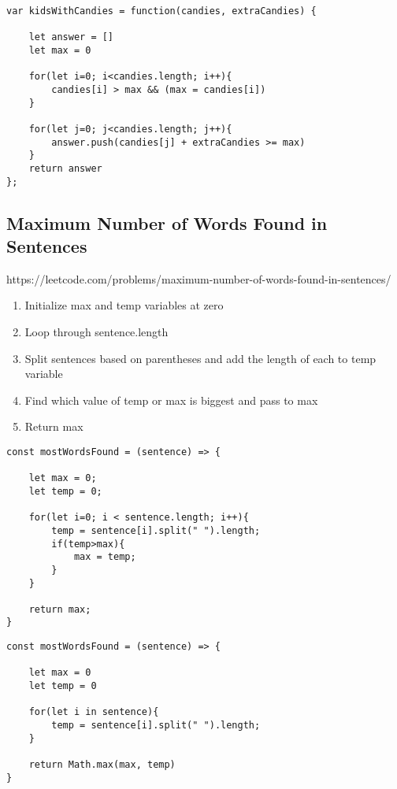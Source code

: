 \documentclass[10pt]{article}
\begin{document}
\begin{lstlisting}[title=Solution kidsWithCandies with for loop, captionpos=t]
var kidsWithCandies = function(candies, extraCandies) {
    
    let answer = []
    let max = 0
    
    for(let i=0; i<candies.length; i++){
        candies[i] > max && (max = candies[i])
    }
    
    for(let j=0; j<candies.length; j++){
        answer.push(candies[j] + extraCandies >= max)
    }
    return answer
};
\end{lstlisting}
\medskip %

\pagebreak
\medskip %
\subsection{Maximum Number of Words Found in Sentences}
https://leetcode.com/problems/maximum-number-of-words-found-in-sentences/

\begin{enumerate}
	\item Initialize max and temp variables at zero 
	\item Loop through sentence.length 
	\item Split sentences based on parentheses and add the length of each to temp variable 
	\item Find which value of temp or max is biggest and pass to max
	\item Return max
\end{enumerate}

\begin{lstlisting}[title=Solution mostWordsFound, captionpos=t]
const mostWordsFound = (sentence) => {

    let max = 0;
    let temp = 0;

    for(let i=0; i < sentence.length; i++){
        temp = sentence[i].split(" ").length;
        if(temp>max){
            max = temp;
        }
    }
    
    return max;
}
\end{lstlisting}

\begin{lstlisting}[title=Solution mostWordsFound with for-in loop and Math.max, captionpos=t]
const mostWordsFound = (sentence) => {
    
    let max = 0
    let temp = 0
    
    for(let i in sentence){
        temp = sentence[i].split(" ").length;
    }
    
    return Math.max(max, temp)
}
\end{lstlisting}
\medskip %
\end{document}
